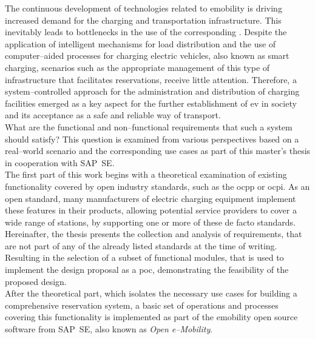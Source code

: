 

\Abstract
The continuous development of technologies related to \acrfull{emobility} is driving increased demand for the charging and transportation infrastructure. This inevitably leads to bottlenecks in the use of the corresponding .
Despite the application of intelligent mechanisms for load distribution and the use of computer--aided processes for charging electric vehicles, also known as smart charging, scenarios such as the appropriate management of this type of infrastructure that facilitates reservations, receive little attention. 
Therefore, a system--controlled approach for the administration and distribution of charging facilities emerged as a key aspect for the further establishment of \acrfull{ev} in society and its acceptance as a safe and reliable way of transport.\\
What are the functional and non--functional requirements that such a system should satisfy? This question is examined from various perspectives based on a real--world scenario and the corresponding use cases as part of this master's thesis in cooperation with SAP~SE.\\
The first part of this work begins with a theoretical examination of existing functionality covered by open industry standards, such as the \acrfull{ocpp} or \acrfull{ocpi}. 
As an open standard, many manufacturers of electric charging equipment implement these features in their products, allowing potential service providers to cover a wide range of stations, by supporting one or more of these de facto standards.
Hereinafter, the thesis presents the collection and analysis of requirements, that are not part of any of the already listed standards at the time of writing. 
Resulting in the selection of a subset of functional modules, that is used to implement the design proposal as a \acrfull{poc}, demonstrating the feasibility of the proposed design.\\
After the theoretical part, which isolates the necessary use cases for building a comprehensive reservation system, a basic set of operations and processes covering this functionality is implemented as part of the \acrshort{emobility} open source software from SAP~SE, also known as \textit{Open e--Mobility}.
